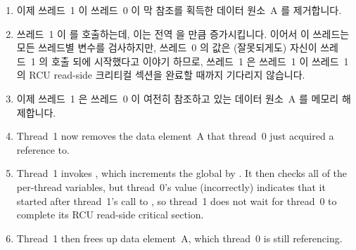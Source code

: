 {{\begin{enumerate}
	\iffalse

	\item	Thread~0 enters \co{rcu_read_lock()}, determines
		that it is not nested, and therefore fetches the
		value of the global \co{rcu_gp_ctr}.
		Thread~0 is then preempted for an extremely long time
		(before storing to its per-thread \co{rcu_reader_gp}
		variable).
	\item	Other threads repeatedly invoke \co{synchronize_rcu()},
		so that the new value of the global \co{rcu_gp_ctr}
		is now \co{RCU_GP_CTR_BOTTOM_BIT}
		less than it was when thread~0 fetched it.
	\item	Thread~0 now starts running again, and stores into
		its per-thread \co{rcu_reader_gp} variable.
		The value it stores is
		\co{RCU_GP_CTR_BOTTOM_BIT+1}
		greater than that of the global \co{rcu_gp_ctr}.
	\item	Thread~0 acquires a reference to RCU-protected data
		element~A.

	\fi

	\item	이제 쓰레드~1 이 쓰레드~0 이 막 참조를 획득한 데이터 원소~A 를
		제거합니다.
	\item	쓰레드~1 이  를 호출하는데, 이는 전역
		 을  만큼
		증가시킵니다.
		이어서 이 쓰레드는 모든 쓰레드별  변수를
		검사하지만, 쓰레드~0 의 값은 (잘못되게도) 자신이 쓰레드~1 의
		 호출 되에 시작했다고 이야기 하므로,
		쓰레드~1 은 쓰레드~1 이 쓰레드~1 의 RCU read-side 크리티컬
		섹션을 완료할 때까지 기다리지 않습니다.
	\item	이제 쓰레드~1 은 쓰레드~0 이 여전히 참조하고 있는 데이터 원소~A
		를 메모리 해제합니다.

	\iffalse

	\item	Thread~1 now removes the data element~A that thread~0
		just acquired a reference to.
	\item	Thread~1 invokes , which
		increments the global  by
		.
		It then checks all of the per-thread 
		variables, but thread~0's value (incorrectly) indicates
		that it started after thread~1's call to
		, so thread~1 does not wait
		for thread~0 to complete its RCU read-side critical
		section.
	\item	Thread~1 then frees up data element~A, which thread~0
		is still referencing.


\end{enumerate}}}
